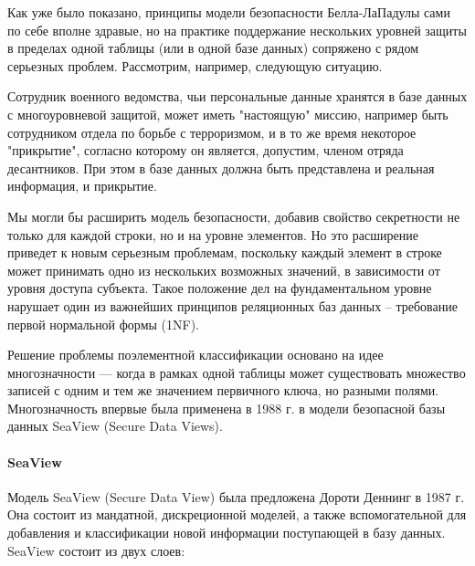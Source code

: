 Как уже было показано,  принципы модели безопасности Белла-ЛаПадулы сами по себе вполне здравые,  но на практике поддержание нескольких уровней защиты в пределах одной таблицы (или в одной базе данных) сопряжено с рядом серьезных проблем.  Рассмотрим, например, следующую ситуацию.

Сотрудник военного ведомства, чьи персональные данные хранятся в базе данных с многоуровневой защитой, может иметь "настоящую" миссию, например быть сотрудником отдела по борьбе с терроризмом, и в то же время некоторое "прикрытие", согласно которому он является, допустим, членом отряда десантников. При этом в базе данных должна быть представлена и реальная информация, и прикрытие.

Мы могли бы расширить модель безопасности, добавив свойство секретности не только для каждой строки, но и на уровне элементов. Но это расширение приведет к новым серьезным проблемам, поскольку каждый элемент в строке может принимать одно из нескольких возможных значений, в зависимости от уровня доступа субъекта. Такое положение дел на фундаментальном уровне нарушает один из важнейших принципов реляционных баз данных – требование первой нормальной формы (1NF)\footnotemark.


Решение проблемы поэлементной классификации основано на идее многозначности ---  когда в рамках одной таблицы может существовать множество записей с одним и тем же значением первичного ключа, но разными полями.  Многозначность впервые была применена в 1988 г. в модели безопасной базы данных SeaView (Secure Data Views).

\paragraph{SeaView}

Модель SeaView (Secure Data View) \autocite{SeaView} была предложена Дороти Деннинг в 1987 г. Она состоит из мандатной, дискреционной моделей, а также вспомогательной для добавления и классификации новой информации поступающей в базу данных. SeaView состоит из двух слоев:

